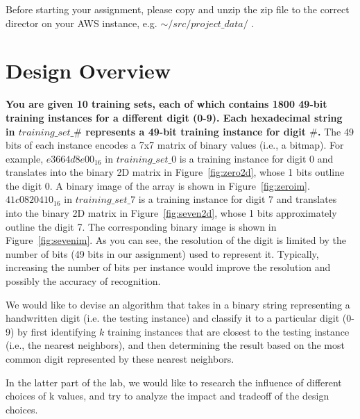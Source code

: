 \documentclass[paper=letter, fontsize=10pt]{scrartcl} %
\numberwithin{equation}{section} %
\numberwithin{figure}{section} %
\numberwithin{table}{section} %
\begin{document}
Before starting your assignment, please copy and unzip the zip file to the correct director on your AWS instance, e.g. $\sim/src/project\_data/$ . 


\section{Design Overview}

\textbf{You are given 10 training sets, each of which contains 1800 49-bit training instances for a different digit (0-9). Each hexadecimal string in $training\_set\_\#$ represents a 49-bit training instance for digit $\#$.} 
The 49 bits of each instance encodes a 7x7 matrix of binary values (i.e., a bitmap). For example, \texttt{$e3664d8e00_{16}$} in $training\_set\_0$ is a training instance for digit 0 and translates into the binary 2D matrix in Figure~\ref{fig:zero2d}, whose 1 bits outline the digit 0. A binary image of the array is shown in Figure~\ref{fig:zeroim}. \texttt{$41c0820410_{16}$} in $training\_set\_7$ is a training instance for digit 7 and translates into the binary 2D matrix in Figure~\ref{fig:seven2d}, whose 1 bits approximately outline the digit 7. The corresponding binary image is shown in Figure~\ref{fig:sevenim}. As you can see, the resolution of the digit is limited by the number of bits (49 bits in our assignment) used to represent it. Typically, increasing the number of bits per instance would improve the resolution and possibly the accuracy of recognition. 

We would like to devise an algorithm that takes in a binary string representing a handwritten digit (i.e. the testing instance) and classify it to a particular digit (0-9) by first identifying $k$ training instances that are closest to the testing instance (i.e., the nearest neighbors), and then determining the result based on the most common digit represented by these nearest neighbors. 

In the latter part of the lab, we would like to research the influence of different choices of k values, and try to analyze the impact and tradeoff of the design choices.
\end{document}
